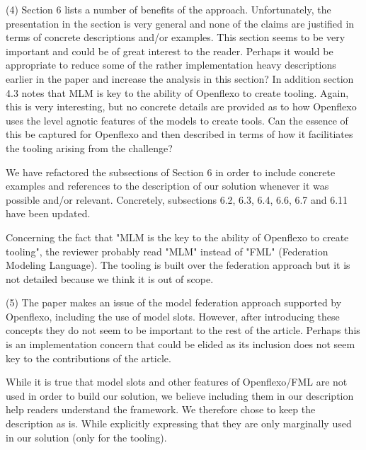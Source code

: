 \documentclass[10pt]{article}
\begin{document}
\begin{response}{(4) Section 6 lists a number of benefits of the approach. Unfortunately, the presentation in the section is very general and none of the claims are justified in terms of concrete descriptions and/or examples. This section seems to be very important and could be of great interest to the reader. Perhaps it would be appropriate to reduce some of the rather implementation heavy descriptions earlier in the paper and increase the analysis in this section? In addition section 4.3 notes that MLM is key to the ability of Openflexo to create tooling. Again, this is very interesting, but no concrete details are provided as to how Openflexo uses the level agnotic features of the models to create tools. Can the essence of this be captured for Openflexo and then described in terms of how it facilitiates the tooling arising from the challenge?}

We have refactored the subsections of Section 6 in order to include concrete examples and references to the description of our solution whenever it was possible and/or relevant. Concretely, subsections 6.2, 6.3, 6.4, 6.6, 6.7 and 6.11 have been updated.%


Concerning the fact that "MLM is the key to the ability of Openflexo to create tooling", the reviewer probably read "MLM" instead of "FML" (Federation Modeling Language). The tooling is built over the federation approach but it is not detailed because we think it is out of scope.

\end{response}

\begin{response}{(5) The paper makes an issue of the model federation approach supported by Openflexo, including the use of model slots. However, after introducing these concepts they do not seem to be important to the rest of the article. Perhaps this is an implementation concern that could be elided as its inclusion does not seem key to the contributions of the article. }

While it is true that model slots and other features of Openflexo/FML are not used in order to build our solution,  we believe including them in our description help readers understand the framework. We therefore chose to keep the description as is. While explicitly expressing that they are only marginally used in our solution (only for the tooling).%
\end{response}
\end{document}
